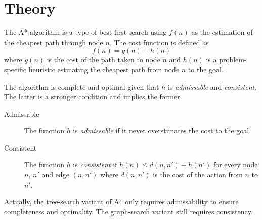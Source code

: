 \section{Theory}

The A* algorithm is a type of best-first search using $f(n)$ as the estimation of the cheapest path through node $n$. The cost function is defined as
\[
f(n) = g(n) + h(n)
\]
where $g(n)$ is the cost of the path taken to node $n$ and $h(n)$ is a problem-specific heuristic estmating the cheapest path from node $n$ to the goal.

The algorithm is complete and optimal given that $h$ is \emph{admissable} and \emph{consistent}. The latter is a stronger condition and implies the former.

\begin{description}
\item[Admissable] The function $h$ is \emph{admissable} if it never overstimates the cost to the goal.

\item[Consistent] The function $h$ is \emph{consistent} if $h(n) \leq d(n, n') + h(n')$ for every node $n$, $n'$ and edge $(n, n')$ where $d(n,n')$ is the cost of the action from $n$ to $n'$.
\end{description}

Actually, the tree-search variant of A* only requires admissability to ensure completeness and optimality. The graph-search variant still requires consistency.
